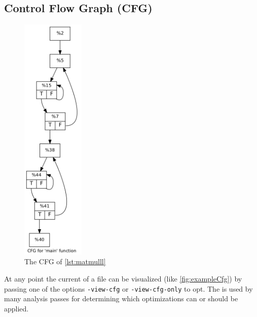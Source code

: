 \subsection{Control Flow Graph (CFG)}
\begin{figure}
    \caption{The CFG of \autoref{lst:matmulll}}
    \label{fig:exampleCfg}
    \includegraphics[height=12cm]{gfx/matmulCfg.png}
\end{figure}
At any point the current \cfg of a \llvmir file can be visualized (like \autoref{fig:exampleCfg}) by passing one of the options \texttt{-view-cfg} or \texttt{-view-cfg-only} to opt.
The \cfg is used by many analysis passes for determining which optimizations can or should be applied.
